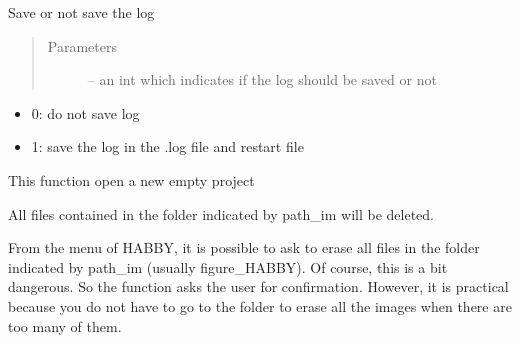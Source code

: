 \documentclass[letterpaper,10pt,english]{sphinxmanual}
\begin{document}
\begin{fulllineitems}

\begin{fulllineitems}
\label{\detokenize{index:src_GUI.Main_windows_1.MainWindows.do_log}}
Save or not save the log
\begin{quote}\begin{description}
\item[{Parameters}] \leavevmode
{} -- an int which indicates if the log should be saved or not

\end{description}\end{quote}
\begin{itemize}
\item {} 
0: do not save log

\item {} 
1: save the log in the .log file and restart file

\end{itemize}

\end{fulllineitems}


\begin{fulllineitems}
\label{\detokenize{index:src_GUI.Main_windows_1.MainWindows.empty_project}}
This function open a new empty project

\end{fulllineitems}


\begin{fulllineitems}
\label{\detokenize{index:src_GUI.Main_windows_1.MainWindows.erase_pict}}
All files contained in the folder indicated by path\_im will be deleted.

From the menu of HABBY, it is possible to ask to erase all files in the folder indicated by path\_im
(usually figure\_HABBY). Of course, this is a bit dangerous. So the function asks the user for confirmation.
However, it is practical because you do not have to go to the folder to erase all the images when there
are too many of them.

\end{fulllineitems}


\end{fulllineitems}
\end{document}
